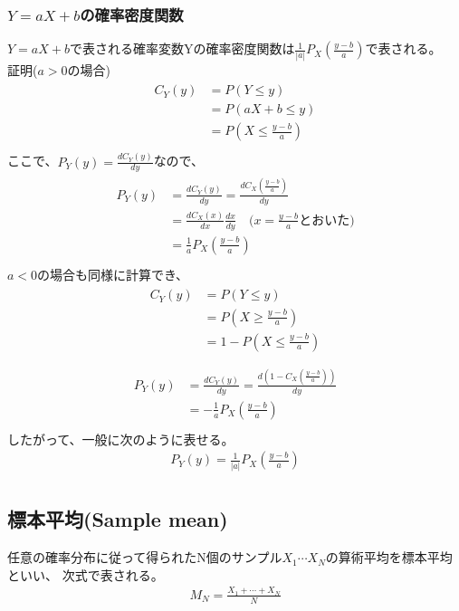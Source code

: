 \documentclass[a4j]{jarticle}
\begin{document}
\subsubsection{$Y=aX+b$の確率密度関数}
$Y=aX+b$で表される確率変数Yの確率密度関数は$\frac{1}{|a|}P_{X}(\frac{y-b}{a})$で表される。\\
証明($a > 0$の場合)
\begin{align}
    \begin{aligned}
    C_{Y}(y)&=P(Y \leq y) \\
    &=P(aX+b \leq y) \\
    &=P(X \leq \frac{y-b}{a}) \\
    \end{aligned}
\end{align}
ここで、$P_{Y}(y)=\frac{dC_{Y}(y)}{dy}$なので、
\begin{align}
    \begin{aligned}
    P_{Y}(y)&=\frac{dC_{Y}(y)}{dy}=\frac{dC_{X}(\frac{y-b}{a})}{dy} \\
    &=\frac{dC_{X}(x)}{dx}\frac{dx}{dy} \quad \text{($x=\frac{y-b}{a}$とおいた)} \\
    &=\frac{1}{a}P_{X}(\frac{y-b}{a}) \\
    \end{aligned}
\end{align}
$a < 0$の場合も同様に計算でき、
\begin{align}
    \begin{aligned}
    C_{Y}(y)&=P(Y \leq y) \\
    &=P(X \geq \frac{y-b}{a}) \\
    &=1-P(X \leq \frac{y-b}{a}) \\
    \end{aligned}
\end{align}
\begin{align}
    \begin{aligned}
    P_{Y}(y)&=\frac{dC_{Y}(y)}{dy}=\frac{d(1-C_{X}(\frac{y-b}{a}))}{dy} \\
    &=-\frac{1}{a}P_{X}(\frac{y-b}{a}) \\
    \end{aligned}
\end{align}
したがって、一般に次のように表せる。
\begin{align}
    P_{Y}(y)=\frac{1}{|a|}P_{X}(\frac{y-b}{a}) \\
\end{align}

\subsection{標本平均(Sample mean)}
任意の確率分布に従って得られたN個のサンプル$X_{1} \cdots X_{N}$の算術平均を標本平均といい、
次式で表される。
\begin{align} 
    M_{N} = \frac{X_{1} + \cdots + X_{N}}{N} 
\end{align}
\end{document}
